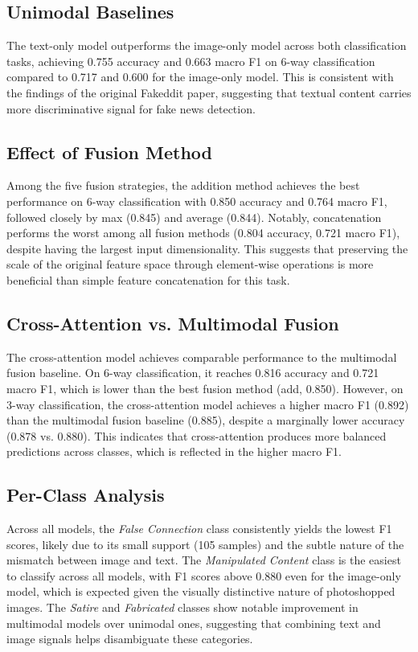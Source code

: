 \subsection{Unimodal Baselines}

The text-only model outperforms the image-only model across both classification tasks, achieving 0.755 accuracy and 0.663 macro F1 on 6-way classification compared to 0.717 and 0.600 for the image-only model. This is consistent with the findings of the original Fakeddit paper, suggesting that textual content carries more discriminative signal for fake news detection.

\subsection{Effect of Fusion Method}

Among the five fusion strategies, the addition method achieves the best performance on 6-way classification with 0.850 accuracy and 0.764 macro F1, followed closely by max (0.845) and average (0.844). Notably, concatenation performs the worst among all fusion methods (0.804 accuracy, 0.721 macro F1), despite having the largest input dimensionality. This suggests that preserving the scale of the original feature space through element-wise operations is more beneficial than simple feature concatenation for this task.

\subsection{Cross-Attention vs. Multimodal Fusion}

The cross-attention model achieves comparable performance to the multimodal fusion baseline. On 6-way classification, it reaches 0.816 accuracy and 0.721 macro F1, which is lower than the best fusion method (add, 0.850). However, on 3-way classification, the cross-attention model achieves a higher macro F1 (0.892) than the multimodal fusion baseline (0.885), despite a marginally lower accuracy (0.878 vs. 0.880). This indicates that cross-attention produces more balanced predictions across classes, which is reflected in the higher macro F1.

\subsection{Per-Class Analysis}

Across all models, the \textit{False Connection} class consistently yields the lowest F1 scores, likely due to its small support (105 samples) and the subtle nature of the mismatch between image and text. The \textit{Manipulated Content} class is the easiest to classify across all models, with F1 scores above 0.880 even for the image-only model, which is expected given the visually distinctive nature of photoshopped images. The \textit{Satire} and \textit{Fabricated} classes show notable improvement in multimodal models over unimodal ones, suggesting that combining text and image signals helps disambiguate these categories.